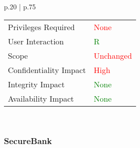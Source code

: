 \begin{longtable*}{ p{.20\textwidth} | p{.75\textwidth} }
\begin{tabular}{l | l}
            Privileges Required     & \textcolor{red}{None} \\
            User Interaction        & \textcolor{Green}{R} \\
            Scope                   & \textcolor{red}{Unchanged} \\
            Confidentiality Impact  & \textcolor{red}{High} \\
            Integrity Impact        & \textcolor{Green}{None} \\
            Availability Impact     & \textcolor{Green}{None}
        \end{tabular} \\
   	\hline
\end{longtable*}

\subsubsection{SecureBank}
